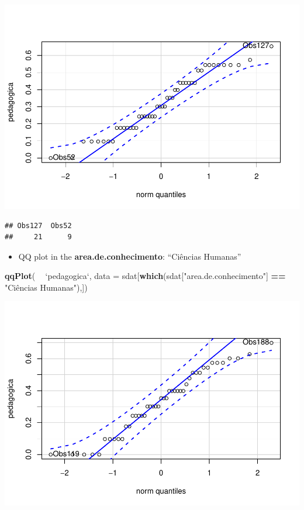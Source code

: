 \documentclass[]{article}
\newenvironment{Shaded}{\begin{snugshade}}{\end{snugshade}}
\newcommand{\DataTypeTok}[1]{\textcolor[rgb]{0.13,0.29,0.53}{#1}}
\newcommand{\KeywordTok}[1]{\textcolor[rgb]{0.13,0.29,0.53}{\textbf{#1}}}
\newcommand{\NormalTok}[1]{#1}
\newcommand{\OperatorTok}[1]{\textcolor[rgb]{0.81,0.36,0.00}{\textbf{#1}}}
\newcommand{\StringTok}[1]{\textcolor[rgb]{0.31,0.60,0.02}{#1}}
\providecommand{\tightlist}{%
  \setlength{\itemsep}{0pt}\setlength{\parskip}{0pt}}
\begin{document}
\includegraphics{factorialAnova_files/figure-latex/unnamed-chunk-28-1.pdf}

\begin{verbatim}
## Obs127  Obs52 
##     21      9
\end{verbatim}

\begin{itemize}
\tightlist
\item
  QQ plot in the \textbf{area.de.conhecimento}: ``Ciências Humanas''
\end{itemize}

\begin{Shaded}
\begin{Highlighting}[]
\KeywordTok{qqPlot}\NormalTok{( }\OperatorTok{~}\StringTok{ `}\DataTypeTok{pedagogica}\StringTok{`}\NormalTok{, }\DataTypeTok{data =}\NormalTok{ sdat[}\KeywordTok{which}\NormalTok{(sdat[}\StringTok{"area.de.conhecimento"}\NormalTok{] }\OperatorTok{==}\StringTok{ "Ciências Humanas"}\NormalTok{),])}
\end{Highlighting}
\end{Shaded}

\includegraphics{factorialAnova_files/figure-latex/unnamed-chunk-29-1.pdf}
\end{document}
